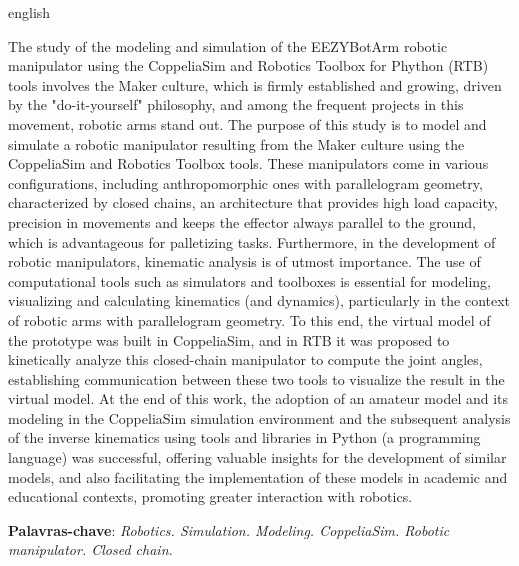 \begin{resumo}[Abstract]
\begin{otherlanguage*}{english}

	The study of the modeling and simulation of the EEZYBotArm robotic manipulator using the CoppeliaSim and Robotics Toolbox for Phython (RTB) tools involves the Maker culture, which is firmly established and growing, driven by the "do-it-yourself" philosophy, and among the frequent projects in this movement, robotic arms stand out. The purpose of this study is to model and simulate a robotic manipulator resulting from the Maker culture using the CoppeliaSim and Robotics Toolbox tools. These manipulators come in various configurations, including anthropomorphic ones with parallelogram geometry, characterized by closed chains, an architecture that provides high load capacity, precision in movements and keeps the effector always parallel to the ground, which is advantageous for palletizing tasks. Furthermore, in the development of robotic manipulators, kinematic analysis is of utmost importance. The use of computational tools such as simulators and toolboxes is essential for modeling, visualizing and calculating kinematics (and dynamics), particularly in the context of robotic arms with parallelogram geometry. To this end, the virtual model of the prototype was built in CoppeliaSim, and in RTB it was proposed to kinetically analyze this closed-chain manipulator to compute the joint angles, establishing communication between these two tools to visualize the result in the virtual model. At the end of this work, the adoption of an amateur model and its modeling in the CoppeliaSim simulation environment and the subsequent analysis of the inverse kinematics using tools and libraries in Python (a programming language) was successful, offering valuable insights for the development of similar models, and also facilitating the implementation of these models in academic and educational contexts, promoting greater interaction with robotics. 
	

	\vspace{\onelineskip}

	\noindent
	\textbf{Palavras-chave}: \textit{Robotics. Simulation. Modeling. CoppeliaSim. Robotic manipulator. Closed chain.}

\end{otherlanguage*}
\end{resumo}


